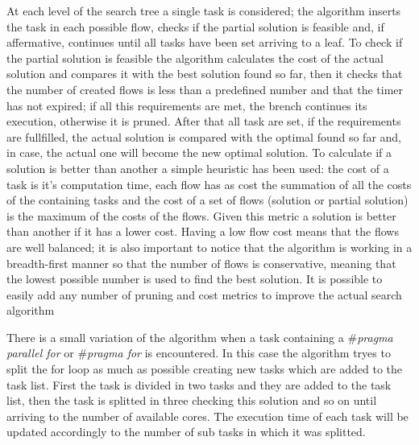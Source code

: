 \documentclass[a4paper,11pt,oneside]{book}
\begin{document}
At each level of the search tree a single task is considered; the algorithm inserts the task in each possible flow, checks if the partial solution is feasible and, if affermative, continues until all tasks have been set arriving to a leaf. To check if the partial solution is feasible the algorithm calculates the cost of the actual solution and compares it with the best solution found so far, then it checks that the number of created flows is less than a predefined number and that the timer has not expired; if all this requirements are met, the brench continues its execution, otherwise it is pruned. After that all task are set, if the requirements are fullfilled, the actual solution is compared with the optimal found so far and, in case, the actual one will become the new optimal solution. To calculate if a solution is better than another a simple heuristic has been used: the cost of a task is it's computation time, each flow has as cost the summation of all the costs of the containing tasks and the cost of a set of flows (solution or partial solution) is the maximum of the costs of the flows. Given this metric a solution is better than another if it has a lower cost. Having a low flow cost means that the flows are well balanced; it is also important to notice that the algorithm is working in a \emph{}breadth-first manner so that the number of flows is conservative, meaning that the lowest possible number is used to find the best solution. It is possible to easily add any number of pruning and cost metrics to improve the actual search algorithm

There is a small variation of the algorithm when a task containing a \emph{$\#$pragma parallel for} or \emph{$\#$pragma  for} is encountered. In this case the algorithm tryes to split the for loop as much as possible creating new tasks which are added to the task list. First the task is divided in two tasks and they are added to the task list, then the task is splitted in three checking this solution and so on until arriving to the number of available cores. The execution time of each task will be updated accordingly to the number of sub tasks in which it was splitted. 
\end{document}
